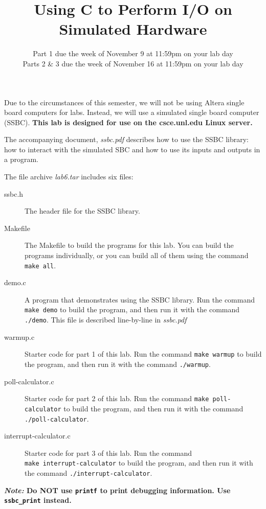 \documentclass[12pt]{article}
\begin{document}
\title{Using C to Perform I/O on Simulated Hardware}
\author{}
\date{Part 1 due the week of November 9 at 11:59pm on your lab day\\
Parts 2 \& 3 due the week of November 16 at 11:59pm on your lab day}
\maketitle

Due to the circumstances of this semester, we will not be using Altera
single board computers for labs. Instead, we will use a simulated single
board computer (SSBC). \textbf{This lab is designed for use on the csce.unl.edu
Linux server.}

The accompanying document, \textit{ssbc.pdf} describes how to use the SSBC
library: how to interact with the simulated SBC and how to use its inputs and
outputs in a program.

The file archive \textit{lab6.tar} includes six files:
\begin{description}
    \item [ssbc.h] The header file for the SSBC library.
    \item [Makefile] The Makefile to build the programs for this lab. You can build the programs individually, or you can build all of them using the command \texttt{make all}.
    \item [demo.c] A program that demonstrates using the SSBC library. Run the
        command \texttt{make demo} to build the program, and then run it with
        the command \texttt{./demo}. This file is described line-by-line in
        \textit{ssbc.pdf}
    \item [warmup.c] Starter code for part 1 of this lab. Run the command
        \texttt{make warmup} to build the program, and then run it with the
        command \texttt{./warmup}.
    \item [poll-calculator.c] Starter code for part 2 of this lab. Run the
        command \texttt{make poll-calculator} to build the program, and then
        run it with the command \texttt{./poll-calculator}.
    \item [interrupt-calculator.c] Starter code for part 3 of this lab. Run the command\\ \texttt{make interrupt-calculator} to build the program, and then run it with the command \texttt{./interrupt-calculator}.
\end{description}

\textbf{\textit{Note: }Do NOT use \texttt{printf} to print debugging
information. Use \texttt{ssbc\_print} instead.}
\end{document}
